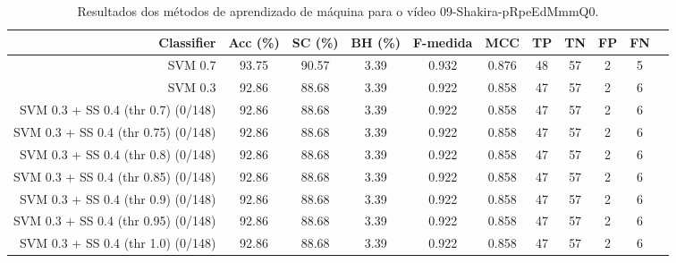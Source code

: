 \begin{table}[!htb]
\centering
\caption{Resultados dos métodos de aprendizado de máquina para o vídeo 09-Shakira-pRpeEdMmmQ0.}
\label{tab:09-Shakira-pRpeEdMmmQ0}
\begin{tabular}{r|c|c|c|c|c|c|c|c|c|c}
\hline\hline
Classifier & Acc (\%) & SC (\%) & BH (\%) & F-medida & MCC & TP & TN & FP & FN \\ \hline
SVM 0.7 & 93.75 & 90.57 & 3.39 & 0.932 & 0.876 & 48 & 57 & 2 & 5 \\ 
SVM 0.3 & 92.86 & 88.68 & 3.39 & 0.922 & 0.858 & 47 & 57 & 2 & 6 \\ 
SVM 0.3 + SS 0.4 (thr 0.7) (0/148) & 92.86 & 88.68 & 3.39 & 0.922 & 0.858 & 47 & 57 & 2 & 6 \\ 
SVM 0.3 + SS 0.4 (thr 0.75) (0/148) & 92.86 & 88.68 & 3.39 & 0.922 & 0.858 & 47 & 57 & 2 & 6 \\ 
SVM 0.3 + SS 0.4 (thr 0.8) (0/148) & 92.86 & 88.68 & 3.39 & 0.922 & 0.858 & 47 & 57 & 2 & 6 \\ 
SVM 0.3 + SS 0.4 (thr 0.85) (0/148) & 92.86 & 88.68 & 3.39 & 0.922 & 0.858 & 47 & 57 & 2 & 6 \\ 
SVM 0.3 + SS 0.4 (thr 0.9) (0/148) & 92.86 & 88.68 & 3.39 & 0.922 & 0.858 & 47 & 57 & 2 & 6 \\ 
SVM 0.3 + SS 0.4 (thr 0.95) (0/148) & 92.86 & 88.68 & 3.39 & 0.922 & 0.858 & 47 & 57 & 2 & 6 \\ 
SVM 0.3 + SS 0.4 (thr 1.0) (0/148) & 92.86 & 88.68 & 3.39 & 0.922 & 0.858 & 47 & 57 & 2 & 6 \\ 
\hline\hline
\end{tabular}
\end{table}
